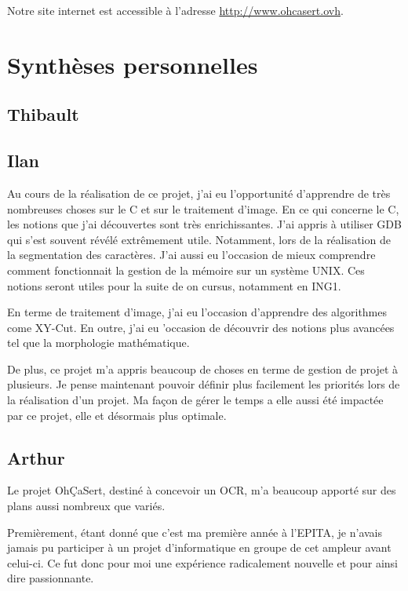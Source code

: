 \documentclass[11pt]{report}
\begin{document}
Notre site internet est accessible à l'adresse \url{http://www.ohcasert.ovh}.

\chapter{Synthèses personnelles}

\section{Thibault}


\section{Ilan}

Au cours de la réalisation de ce projet, j'ai eu l’opportunité d'apprendre de très nombreuses choses sur le C et sur le traitement d'image. En ce qui concerne le C, les notions que j'ai découvertes sont très enrichissantes. J'ai appris à utiliser GDB qui s'est souvent révélé extrêmement utile. Notamment, lors de la réalisation de la segmentation des caractères. J'ai aussi eu l'occasion de mieux comprendre comment fonctionnait la gestion de la mémoire sur un système UNIX. Ces notions seront utiles pour la suite de on cursus, notamment en ING1.

En terme de traitement d'image, j'ai eu l'occasion d'apprendre des algorithmes come XY-Cut. En outre, j'ai eu 'occasion de découvrir des notions plus avancées tel que la morphologie mathématique.

De plus, ce projet m'a appris beaucoup de choses en terme de gestion de projet à plusieurs. Je pense maintenant pouvoir définir plus facilement les priorités lors de la réalisation d'un projet. Ma façon de gérer le temps a elle aussi été impactée par ce projet, elle et désormais plus optimale.

\section{Arthur}

Le projet OhÇaSert, destiné à concevoir un OCR, m’a beaucoup apporté sur des plans aussi nombreux que variés.

Premièrement, étant donné que c’est ma première année à l’EPITA, je n’avais jamais pu participer à un projet d’informatique en groupe de cet ampleur avant celui-ci. Ce fut donc pour moi une expérience radicalement nouvelle et pour ainsi dire passionnante.
\end{document}
